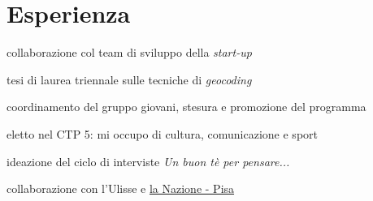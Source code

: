 \documentclass[a4paper]{deedy-resume} %
\begin{document}
\begin{minipage}[t]{0.66\textwidth} %


\section{Esperienza}



\vspace{\topsep} %
\begin{tightitemize}
\item collaborazione col team di sviluppo della \textit{start-up}
\item tesi di laurea triennale sulle tecniche di \textit{geocoding}
\end{tightitemize}

\sectionspace %



\begin{tightitemize}
\item coordinamento del gruppo giovani, stesura e promozione del programma
\item eletto nel CTP 5: mi occupo di cultura, comunicazione e sport
\end{tightitemize}

\sectionspace %



\begin{tightitemize}
\item ideazione del ciclo di interviste \textit{Un buon tè per pensare...}
\item collaborazione con l'Ulisse e \href{http://rassegnastampa.unipi.it/rassegna/archivio/2012/02/21SIG2034.PDF}{la Nazione - Pisa}
\end{tightitemize}


\end{minipage}
\end{document}
